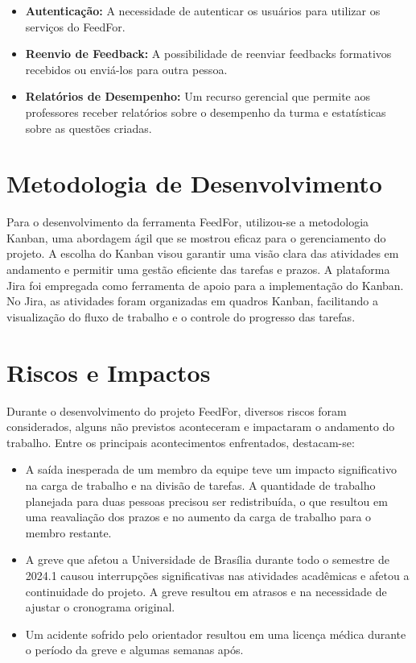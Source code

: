\begin{itemize}
    \item \textbf{Autenticação:} A necessidade de autenticar os usuários para utilizar os serviços do FeedFor.
    \item \textbf{Reenvio de Feedback:} A possibilidade de reenviar feedbacks formativos recebidos ou enviá-los para outra pessoa.
    \item \textbf{Relatórios de Desempenho:} Um recurso gerencial que permite aos professores receber relatórios sobre o desempenho da turma e estatísticas sobre as questões criadas.
\end{itemize}

\section{Metodologia de Desenvolvimento}

Para o desenvolvimento da ferramenta FeedFor, utilizou-se a metodologia Kanban, uma abordagem ágil que se mostrou eficaz para o gerenciamento do projeto. A escolha do Kanban visou garantir uma visão clara das atividades em andamento e permitir uma gestão eficiente das tarefas e prazos. A plataforma Jira foi empregada como ferramenta de apoio para a implementação do Kanban. No Jira, as atividades foram organizadas em quadros Kanban, facilitando a visualização do fluxo de trabalho e o controle do progresso das tarefas.

\section{Riscos e Impactos}

Durante o desenvolvimento do projeto FeedFor, diversos riscos foram considerados, alguns não previstos aconteceram e impactaram o andamento do trabalho. Entre os principais acontecimentos enfrentados, destacam-se:

\begin{itemize}
    \item A saída inesperada de um membro da equipe teve um impacto significativo na carga de trabalho e na divisão de tarefas. A quantidade de trabalho planejada para duas pessoas precisou ser redistribuída, o que resultou em uma reavaliação dos prazos e no aumento da carga de trabalho para o membro restante.
    \item A greve que afetou a Universidade de Brasília durante todo o semestre de 2024.1 causou interrupções significativas nas atividades acadêmicas e afetou a continuidade do projeto. A greve resultou em atrasos e na necessidade de ajustar o cronograma original.
    \item Um acidente sofrido pelo orientador resultou em uma licença médica durante o período da greve e algumas semanas após.
\end{itemize}

